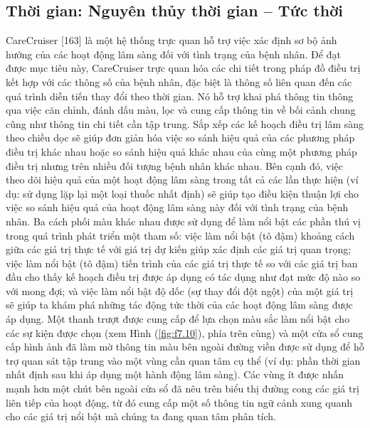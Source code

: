 \subsection{Thời gian: Nguyên thủy thời gian – Tức thời}
CareCruiser [163] là một hệ thống trực quan hỗ trợ việc xác định sơ bộ ảnh hưởng của các hoạt động lâm sàng đối với tình trạng của bệnh nhân. Để đạt được mục tiêu này, CareCruiser trực quan hóa các chi tiết trong pháp đồ điều trị kết hợp với các thông số của bệnh nhân, đặc biệt là thông số liên quan đến các quá trình diễn tiến thay đổi theo thời gian. Nó hỗ trợ khai phá thông tin thông qua việc căn chỉnh, đánh dấu màu, lọc và cung cấp thông tin về bối cảnh chung cũng như thông tin chi tiết cần tập trung. Sắp xếp các kế hoạch điều trị lâm sàng theo chiều dọc sẽ giúp đơn giản hóa việc so sánh hiệu quả của các phương pháp điều trị khác nhau hoặc so sánh hiệu quả khác nhau của cùng một phương pháp điều trị nhưng trên nhiều đối tượng bệnh nhân khác nhau. Bên cạnh đó, việc theo dõi hiệu quả của một hoạt động lâm sàng trong tất cả các lần thực hiện (ví dụ: sử dụng lặp lại một loại thuốc nhất định) sẽ giúp tạo điều kiện thuận lợi cho việc so sánh hiệu quả của hoạt động lâm sàng này đối với tình trạng của bệnh nhân. Ba cách phối màu khác nhau được sử dụng để làm nổi bật các phần thú vị trong quá trình phát triển một tham số: việc làm nổi bật (tô đậm) khoảng cách giữa các giá trị thực tế với giá trị dự kiến giúp xác định các giá trị quan trọng; việc làm nổi bật (tô đậm) tiến trình của các giá trị thực tế so với các giá trị ban đầu cho thấy kế hoạch điều trị được áp dụng có tác dụng như đạt mức độ nào so với mong đợi; và việc làm nổi bật độ dốc (sự thay đổi đột ngột) của một giá trị sẽ giúp ta khám phá những tác động tức thời của các hoạt động lâm sàng được áp dụng. Một thanh trượt được cung cấp để lựa chọn màu sắc làm nổi bật cho các sự kiện được chọn (xem Hình (\ref{fig:f7.10}), phía trên cùng) và một cửa sổ cung cấp hình ảnh đã làm mờ thông tin màu bên ngoài đường viền được sử dụng để hỗ trợ quan sát tập trung vào một vùng cần quan tâm cụ thể (ví dụ: phần thời gian nhất định sau khi áp dụng một hành động lâm sàng). Các vùng ít được nhấn mạnh hơn một chút bên ngoài cửa sổ đã nêu trên biểu thị đường cong các giá trị liên tiếp của hoạt động, từ đó cung cấp một số thông tin ngữ cảnh xung quanh cho các giá trị nổi bật mà chúng ta đang quan tâm phân tích. 
